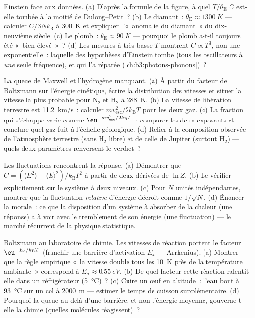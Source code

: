 \begin{exercise}[$\star\star$]\label{exo:b3:canonical-ensemble:6}
Einstein face aux données. (a) D'après la formule de la figure, à quel
$T/\theta_{\text{E}}$ $C$ est-elle tombée à la moitié de
Dulong--Petit~? (b) Le diamant~: $\theta_{\text{E}} \approx \qty{1300}{K}$
--- calculer $C/3Nk_{\text{B}}$ à \qty{300}{K} et expliquer
l'«~anomalie du diamant~» du dix-neuvième siècle. (c) Le plomb~: $\theta_{\text{E}}
\approx \qty{90}{K}$ --- pourquoi le plomb a-t-il toujours été
«~bien élevé~»~? (d) Les mesures à très basse $T$ montrent
$C \propto T^3$, non une exponentielle~: laquelle des hypothèses
d'Einstein tombe (tous les oscillateurs à \emph{une} seule
fréquence), et qui l'a réparée (\cref{ch:b3:photons-phonons})~?
\end{exercise}

\begin{exercise}[$\star\star$]\label{exo:b3:canonical-ensemble:7}
La queue de Maxwell et l'hydrogène manquant. (a) À partir du facteur
de Boltzmann sur l'énergie cinétique, écrire la distribution des
vitesses et situer la vitesse la plus probable pour N$_2$ et H$_2$ à
\qty{288}{K}. (b) La vitesse de libération terrestre est
\qty{11.2}{km/s}~: calculer $mv_{\text{esc}}^2/2k_{\text{B}}T$ pour
les deux gaz. (c) La fraction qui s'échappe varie comme
$\eu^{-mv_{\text{esc}}^2/2k_{\text{B}}T}$~: comparer les deux
exposants et conclure quel gaz fuit à l'échelle géologique. (d)
Relier à la composition observée de l'atmosphère terrestre (sans
H$_2$ libre) et de celle de Jupiter (surtout H$_2$) --- quels deux
paramètres renversent le verdict~?
\end{exercise}

\begin{exercise}[$\star\star$]\label{exo:b3:canonical-ensemble:8}
Les fluctuations rencontrent la réponse. (a) Démontrer que $C = (\langle E^2\rangle -
\langle E\rangle^2)/k_{\text{B}}T^2$ à partir de deux dérivées de $\ln
Z$. (b) Le vérifier explicitement sur le système à deux niveaux. (c)
Pour $N$ unités indépendantes, montrer que la fluctuation
\emph{relative} d'énergie décroît comme $1/\sqrt N$. (d) Énoncer la
morale~: ce que la disposition d'un système à absorber de la chaleur
(une réponse) a à voir avec le tremblement de son énergie (une
fluctuation) --- le marché récurrent de la physique statistique.
\end{exercise}

\begin{exercise}[$\star\star$]\label{exo:b3:canonical-ensemble:9}
Boltzmann au laboratoire de chimie. Les vitesses de réaction portent
le facteur $\eu^{-E_a/k_{\text{B}}T}$ (franchir une barrière
d'activation $E_a$ --- Arrhenius). (a) Montrer que la règle empirique
«~la vitesse double tous les \qty{10}{K} près de la température
ambiante~» correspond à $E_a \approx
\qty{0.55}{eV}$. (b) De quel facteur cette réaction ralentit-elle dans
un réfrigérateur (\qty{5}{\celsius})~? (c) Cuire un œuf en altitude~:
l'eau bout à \qty{93}{\celsius} sur un col à \qty{2000}{m} --- estimer
le temps de cuisson supplémentaire. (d) Pourquoi la queue au-delà
d'une barrière, et non l'énergie moyenne, gouverne-t-elle la chimie
(quelles molécules réagissent)~?
\end{exercise}

